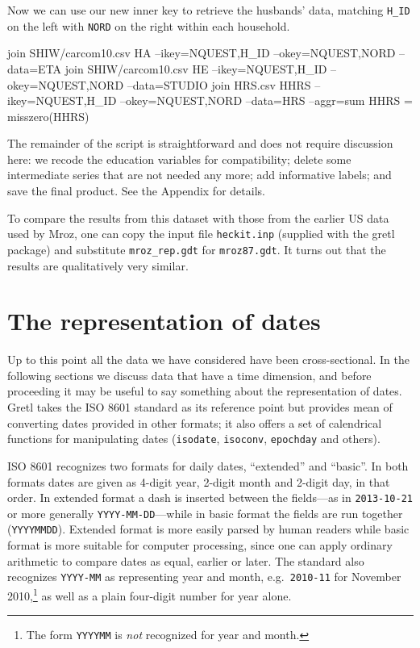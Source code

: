 %
Now we can use our new inner key to retrieve the husbands' data,
matching \verb|H_ID| on the left with \texttt{NORD} on the right
within each household.
%
\begin{code}
join SHIW/carcom10.csv HA --ikey=NQUEST,H_ID --okey=NQUEST,NORD --data=ETA
join SHIW/carcom10.csv HE --ikey=NQUEST,H_ID --okey=NQUEST,NORD --data=STUDIO
join HRS.csv HHRS --ikey=NQUEST,H_ID --okey=NQUEST,NORD --data=HRS --aggr=sum
HHRS = misszero(HHRS)
\end{code}
%
The remainder of the script is straightforward and does not require
discussion here: we recode the education variables for compatibility;
delete some intermediate series that are not needed any more; add
informative labels; and save the final product. See the Appendix for
details.

To compare the results from this dataset with those from the earlier
US data used by Mroz, one can copy the input file \texttt{heckit.inp}
(supplied with the gretl package) and substitute \verb|mroz_rep.gdt|
for \texttt{mroz87.gdt}. It turns out that the results are
qualitatively very similar.

\section{The representation of dates}
\label{sec:join-isodates}

Up to this point all the data we have considered have been
cross-sectional. In the following sections we discuss data that have a
time dimension, and before proceeding it may be useful to say
something about the representation of dates. Gretl takes the ISO 8601
standard as its reference point but provides mean of converting dates
provided in other formats; it also offers a set of calendrical
functions for manipulating dates (\texttt{isodate}, \texttt{isoconv},
\texttt{epochday} and others).

ISO 8601 recognizes two formats for daily dates, ``extended'' and
``basic''. In both formats dates are given as 4-digit year, 2-digit
month and 2-digit day, in that order. In extended format a dash is
inserted between the fields---as in \texttt{2013-10-21} or more
generally \texttt{YYYY-MM-DD}---while in basic format the fields are
run together (\texttt{YYYYMMDD}). Extended format is more easily
parsed by human readers while basic format is more suitable for
computer processing, since one can apply ordinary arithmetic to
compare dates as equal, earlier or later.  The standard also
recognizes \texttt{YYYY-MM} as representing year and month, e.g.\
\texttt{2010-11} for November 2010,\footnote{The form \texttt{YYYYMM}
  is \textit{not} recognized for year and month.} as well as
a plain four-digit number for year alone.

